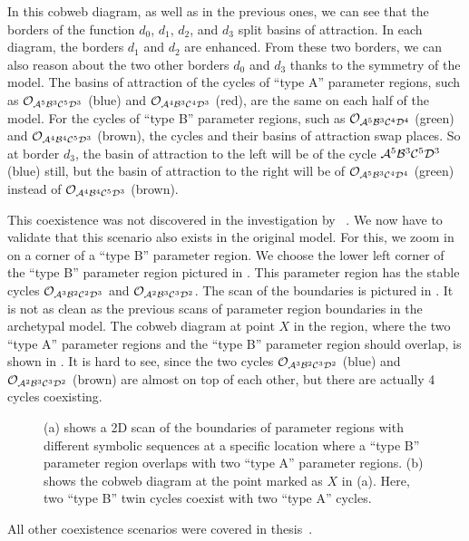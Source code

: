 In this cobweb diagram, as well as in the previous ones, we can see that the borders of the function $d_0$, $d_1$, $d_2$, and $d_3$ split basins of attraction.
In each diagram, the borders $d_1$ and $d_2$ are enhanced.
From these two borders, we can also reason about the two other borders $d_0$ and $d_3$ thanks to the symmetry of the model.
The basins of attraction of the cycles of ``type A'' parameter regions, such as $\mathcal{O}_{\mathcal{A}^5\mathcal{B}^3\mathcal{C}^5\mathcal{D}^3}$ (blue) and $\mathcal{O}_{\mathcal{A}^4\mathcal{B}^3\mathcal{C}^4\mathcal{D}^3}$ (red), are the same on each half of the model.
For the cycles of ``type B'' parameter regions, such as $\mathcal{O}_{\mathcal{A}^5\mathcal{B}^3\mathcal{C}^4\mathcal{D}^4}$ (green) and $\mathcal{O}_{\mathcal{A}^4\mathcal{B}^4\mathcal{C}^5\mathcal{D}^3}$ (brown), the cycles and their basins of attraction swap places.
So at border $d_3$, the basin of attraction to the left will be of the cycle $\mathcal{A}^5\mathcal{B}^3\mathcal{C}^5\mathcal{D}^3$ (blue) still, but the basin of attraction to the right will be of $\mathcal{O}_{\mathcal{A}^5\mathcal{B}^3\mathcal{C}^4\mathcal{D}^4}$ (green) instead of $\mathcal{O}_{\mathcal{A}^4\mathcal{B}^4\mathcal{C}^5\mathcal{D}^3}$ (brown).

This coexistence was not discovered in the investigation by ~\cite{akyuz2022}.
We now have to validate that this scenario also exists in the original model.
For this, we zoom in on a corner of a ``type B'' parameter region.
We choose the lower left corner of the ``type B'' parameter region pictured in .
This parameter region has the stable cycles $\mathcal{O}_{\mathcal{A}^3\mathcal{B}^2\mathcal{C}^2\mathcal{D}^3}$ and $\mathcal{O}_{\mathcal{A}^2\mathcal{B}^3\mathcal{C}^3\mathcal{D}^2}$.
The scan of the boundaries is pictured in .
It is not as clean as the previous scans of parameter region boundaries in the archetypal model.
The cobweb diagram at point $X$ in the region, where the two ``type A'' parameter regions and the ``type B'' parameter region should overlap, is shown in .
It is hard to see, since the two cycles $\mathcal{O}_{\mathcal{A}^3\mathcal{B}^2\mathcal{C}^3\mathcal{D}^2}$ (blue) and $\mathcal{O}_{\mathcal{A}^2\mathcal{B}^3\mathcal{C}^3\mathcal{D}^2}$ (brown) are almost on top of each other, but there are actually 4 cycles coexisting.

\begin{figure}
	\centering
	\caption[2D boundary scan and cobweb diagram of the original model showing coexistence of four cycles]{
		(a) shows a 2D scan of the boundaries of parameter regions with different symbolic sequences at a specific location where a ``type B'' parameter region overlaps with two ``type A'' parameter regions.
		(b) shows the cobweb diagram at the point marked as $X$ in (a).
		Here, two ``type B'' twin cycles coexist with two ``type A'' cycles.
	}
\end{figure}

All other coexistence scenarios were covered in  thesis~\cite{akyuz2022}.
